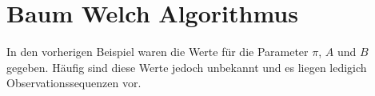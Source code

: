 


\section{Baum Welch Algorithmus}
In den vorherigen Beispiel waren die Werte für die Parameter $\pi$, $A$ und $B$ gegeben.
Häufig sind diese Werte jedoch unbekannt und es liegen ledigich Observationssequenzen vor.




















